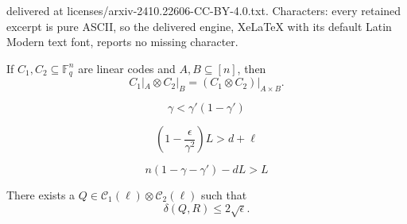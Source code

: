 \documentclass[10pt,a4paper]{amsart}
\newcommand{\C}{\mathcal{C}}
\newcommand{\F}{\mathbb{F}}
\begin{document}
delivered at licenses/arxiv-2410.22606-CC-BY-4.0.txt. Characters: every retained excerpt is pure ASCII, so the delivered engine, XeLaTeX with its default Latin Modern text font, reports no missing character.
\begin{prop}
\label{tensor_restrict}
    If $C_1, C_2 \subseteq \F_q^n$ are linear codes and $A, B \subseteq [n]$, then 
    \[C_1|_A \otimes C_2|_B = (C_1 \otimes C_2)|_{A \times B}.\]
\end{prop}

\begin{equation} \label{ineq1}
    \gamma < \gamma'(1-\gamma')
\end{equation}

\begin{equation} \label{ineq2}
    \left(1-\frac{\epsilon}{\gamma^2}\right)L > d + \ell
\end{equation}

\begin{equation} \label{ineq3}
    n(1 - \gamma - \gamma') - dL > L
\end{equation}

\begin{lemma}
\label{lemma1}
There exists a $Q \in \C_1(\ell) \otimes \C_2(\ell)$ such that $$\delta(Q, R) \leq 2 \sqrt{\epsilon}.$$
\end{lemma}
\end{document}
